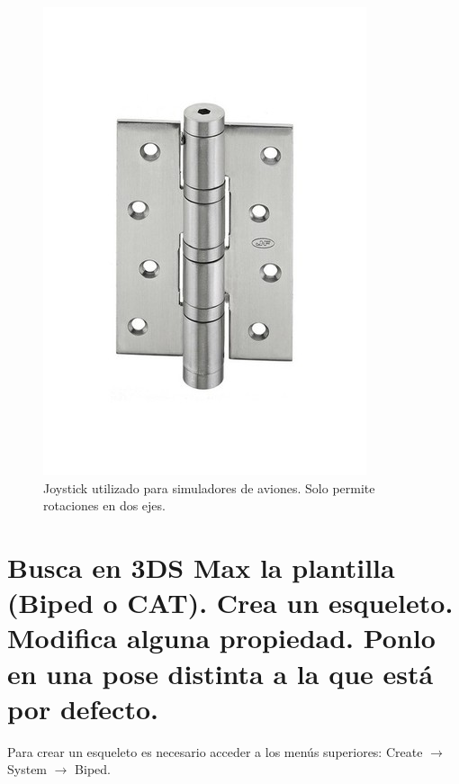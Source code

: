 \documentclass{article}
\begin{document}
\begin{figure}[H]
   \centering
   \includegraphics[width=\textwidth]{imagenes/bisagra.jpeg}
   \caption{Joystick utilizado para simuladores de aviones. Solo permite rotaciones en dos ejes\cite{joystick}.}
\end{figure}

\section{Busca en 3DS Max la plantilla (Biped o CAT). Crea un esqueleto. Modifica alguna propiedad. Ponlo en una pose distinta a la que está por defecto.}

Para crear un esqueleto es necesario acceder a los menús superiores: Create $\rightarrow$ System $\rightarrow$ Biped.
\end{document}
